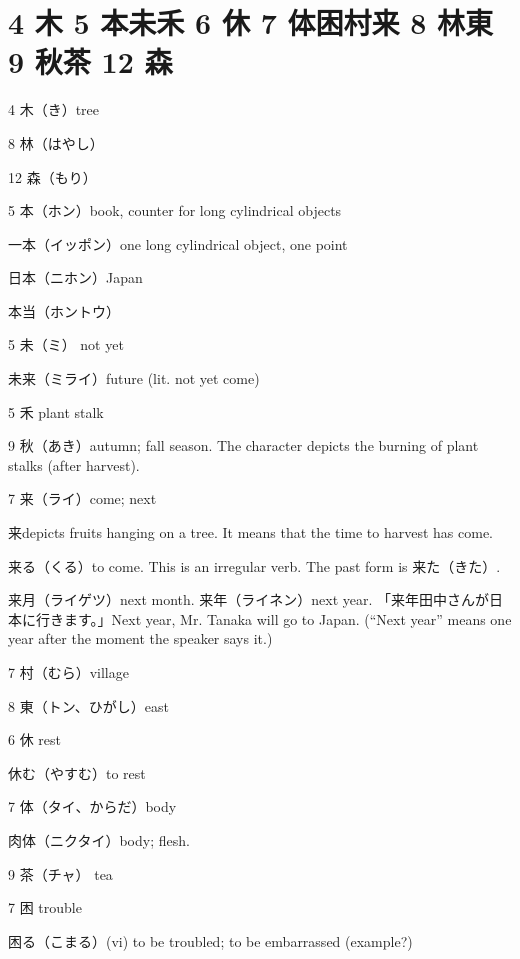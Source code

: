 \section{4 木 5 本未禾 6 休 7 体困村来 8 林東 9 秋茶 12 森}

4 木（き）tree

8 林（はやし）

12 森（もり）

5 本（ホン）book, counter for long cylindrical objects

一本（イッポン）one long cylindrical object, one point

日本（ニホン）Japan

本当（ホントウ）

5 未（ミ） not yet

未来（ミライ）future (lit. not yet come)

5 禾 plant stalk

9 秋（あき）autumn; fall season.
The character depicts the burning of plant stalks (after harvest).

7 来（ライ）come; next

来depicts fruits hanging on a tree.
It means that the time to harvest has come.

来る（くる）to come. This is an irregular verb. The past form is 来た（きた）.

来月（ライゲツ）next month.
来年（ライネン）next year.
「来年田中さんが日本に行きます。」Next year, Mr. Tanaka will go to Japan.
(``Next year'' means one year after the moment the speaker says it.)

7 村（むら）village

8 東（トン、ひがし）east

6 休 rest

休む（やすむ）to rest

7 体（タイ、からだ）body

肉体（ニクタイ）body; flesh.

9 茶（チャ） tea

7 困 trouble

困る（こまる）(vi) to be troubled; to be embarrassed
(example?)
